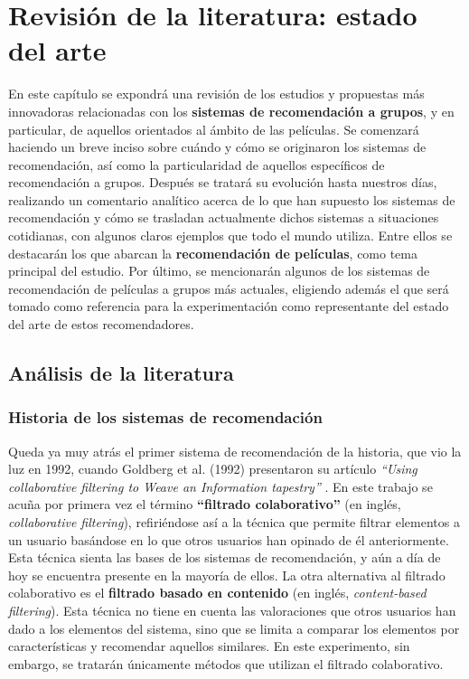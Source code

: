 \chapter{Revisión de la literatura: estado del arte}

En este capítulo se expondrá una revisión de los estudios y propuestas más innovadoras relacionadas con los \textbf{sistemas de recomendación a grupos}, y en particular, de aquellos orientados al ámbito de las películas. Se comenzará haciendo un breve inciso sobre cuándo y cómo se originaron los sistemas de recomendación, así como la particularidad de aquellos específicos de recomendación a grupos. Después se tratará su evolución hasta nuestros días, realizando un comentario analítico acerca de lo que han supuesto los sistemas de recomendación y cómo se trasladan actualmente dichos sistemas a situaciones cotidianas, con algunos claros ejemplos que todo el mundo utiliza. Entre ellos se destacarán los que abarcan la \textbf{recomendación de películas}, como tema principal del estudio. Por último, se mencionarán algunos de los sistemas de recomendación de películas a grupos más actuales, eligiendo además el que será tomado como referencia para la experimentación como representante del estado del arte de estos recomendadores.

\section{Análisis de la literatura}

\subsection{Historia de los sistemas de recomendación}

Queda ya muy atrás el primer sistema de recomendación de la historia, que vio la luz en 1992, cuando Goldberg et al. (1992) presentaron su artículo \textit{``Using collaborative filtering to Weave an Information tapestry''} \cite{tapestry-goldberg}. En este trabajo se acuña por primera vez el término \textbf{``filtrado colaborativo''} (en inglés, \textit{collaborative filtering}), refiriéndose así a la técnica que permite filtrar elementos a un usuario basándose en lo que otros usuarios han opinado de él anteriormente. Esta técnica sienta las bases de los sistemas de recomendación, y aún a día de hoy se encuentra presente en la mayoría de ellos. La otra alternativa al filtrado colaborativo es el \textbf{filtrado basado en contenido} (en inglés, \textit{content-based filtering}). Esta técnica no tiene en cuenta las valoraciones que otros usuarios han dado a los elementos del sistema, sino que se limita a comparar los elementos por características y recomendar aquellos similares. En este experimento, sin embargo, se tratarán únicamente métodos que utilizan el filtrado colaborativo.

